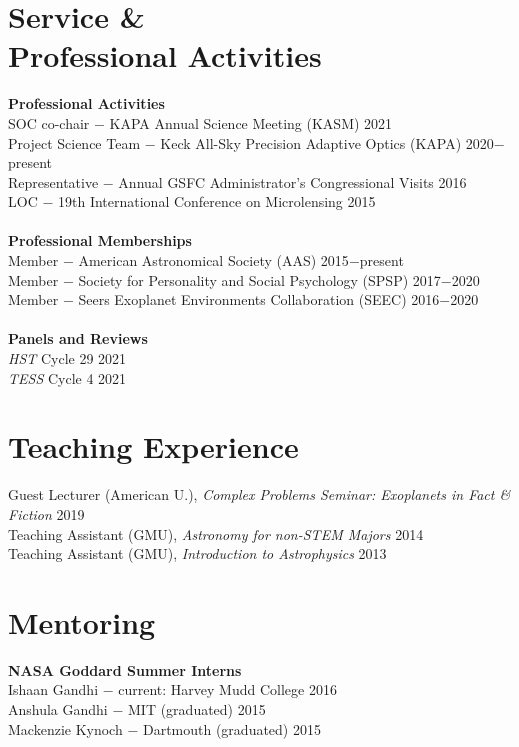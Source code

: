 \documentclass[margin,line]{res}
\begin{document}
\begin{resume}
\section{\sc Service \&\\ Professional Activities}
\textbf{Professional Activities}\\
SOC co-chair $-$ KAPA Annual Science Meeting (KASM) \hfill 2021\\
Project Science Team $-$ Keck All-Sky Precision Adaptive Optics (KAPA) \hfill 2020$-$present\\
Representative $-$ Annual GSFC Administrator's Congressional Visits \hfill 2016\\
LOC $-$ 19th International Conference on Microlensing \hfill 2015\\
\\
\textbf{Professional Memberships}\\
Member $-$ American Astronomical Society (AAS) \hfill 2015$-$present\\
Member $-$ Society for Personality and Social Psychology (SPSP) \hfill 2017$-$2020\\
Member $-$ Seers Exoplanet Environments Collaboration (SEEC) \hfill 2016$-$2020\\
\\
\textbf{Panels and Reviews}\\
\textit{HST} Cycle 29 \hfill 2021\\
\textit{TESS} Cycle 4 \hfill 2021\\

\section{\sc Teaching Experience}
Guest Lecturer (American U.), \textit{Complex Problems Seminar: Exoplanets in Fact \& Fiction} \hfill 2019 \\
Teaching Assistant (GMU), \textit{Astronomy for non-STEM Majors} \hfill 2014 \\
Teaching Assistant (GMU), \textit{Introduction to Astrophysics} \hfill 2013 \\

\section{\sc Mentoring}
\textbf{NASA Goddard Summer Interns} \\
Ishaan Gandhi $-$ current: Harvey Mudd College \hfill 2016 \\
Anshula Gandhi $-$ MIT (graduated) \hfill 2015\\
Mackenzie Kynoch $-$ Dartmouth (graduated) \hfill 2015 \\


\end{resume}
\end{document}
